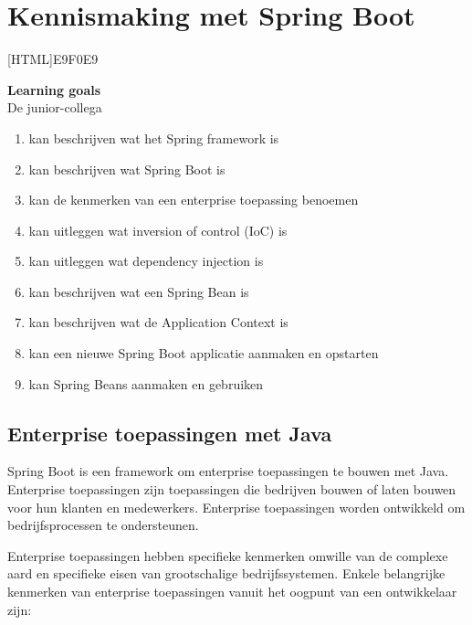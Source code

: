 \chapter{Kennismaking met Spring Boot}
    
[HTML]{E9F0E9}{\parbox{\textwidth}{%
\noindent \textbf{Learning goals}\\
De junior-collega
\begin{enumerate}[nolistsep]
\item kan beschrijven wat het Spring framework is
\item kan beschrijven wat Spring Boot is
\item kan de kenmerken van een enterprise toepassing benoemen
\item kan uitleggen wat inversion of control (IoC) is
\item kan uitleggen wat dependency injection is
\item kan beschrijven wat een Spring Bean is
\item kan beschrijven wat de Application Context is
\item kan een nieuwe Spring Boot applicatie aanmaken en opstarten
\item kan Spring Beans aanmaken en gebruiken
\end{enumerate}}}


\section{Enterprise toepassingen met Java}

Spring Boot is een framework om enterprise toepassingen te bouwen met Java.
Enterprise toepassingen zijn toepassingen die bedrijven bouwen of laten bouwen voor hun klanten en medewerkers.  Enterprise toepassingen worden ontwikkeld om bedrijfsprocessen te ondersteunen. 

Enterprise toepassingen hebben specifieke kenmerken omwille van de complexe aard en specifieke eisen van grootschalige bedrijfssystemen.  Enkele belangrijke kenmerken van enterprise toepassingen vanuit het oogpunt van een ontwikkelaar zijn:

